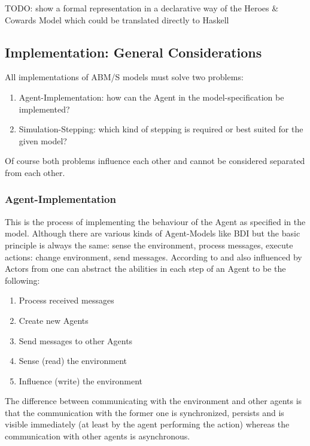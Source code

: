 TODO: show a formal representation in a declarative way of the Heroes \& Cowards Model which could be translated directly to Haskell

\subsection{Implementation: General Considerations}
All implementations of ABM/S models must solve two problems:

\begin{enumerate}
\item Agent-Implementation: how can the Agent in the model-specification be implemented?
\item Simulation-Stepping: which kind of stepping is required or best suited for the given model?
\end{enumerate}

Of course both problems influence each other and cannot be considered separated from each other.

\subsubsection{Agent-Implementation}
This is the process of implementing the behaviour of the Agent as specified in the model. Although there are various kinds of Agent-Models like BDI but the basic principle is always the same: sense the environment, process messages, execute actions: change environment, send messages. According to \cite{wooldridge_introduction_2009} and also influenced by Actors from \cite{agha_actors:_1986} one can abstract the abilities in each step of an Agent to be the following:

\begin{enumerate}
\item Process received messages
\item Create new Agents
\item Send messages to other Agents
\item Sense (read) the environment
\item Influence (write) the environment
\end{enumerate}

The difference between communicating with the environment and other agents is that the communication with the former one is synchronized, persists and is visible immediately (at least by the agent performing the action) whereas the communication with other agents is asynchronous.


